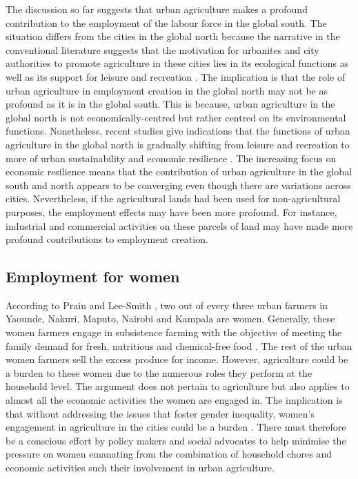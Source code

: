 The discussion so far suggests that urban agriculture makes a profound contribution to the employment of the labour force in the global south. The situation differs from the cities in the global north because the narrative in the conventional literature suggests that the motivation for urbanites and city authorities to promote agriculture in these cities lies in its ecological functions as well as its support for leisure and recreation \cite{Pearson2010}. The implication is that the role of urban agriculture in employment creation in the global north may not be as profound as it is in the global south. This is because, urban agriculture in the global north is not economically-centred but rather centred on its environmental functions. Nonetheless, recent studies give indications that the functions of urban agriculture in the global north is gradually shifting from leisure and recreation to more of urban sustainability and economic resilience \cite{McClintock2010}. The increasing focus on economic resilience means that the contribution of urban agriculture in the global south and north appears to be converging even though there are variations across cities. Nevertheless, if the agricultural lands had been used for non-agricultural purposes, the employment effects may have been more profound. For instance, industrial and commercial activities on these parcels of land may have made more profound contributions to employment creation.

\subsection{Employment for women}

According to Prain and Lee-Smith \cite{Prain2010}, two out of every three urban farmers in Yaounde, Nakuri, Maputo, Nairobi and Kampala are women. Generally, these women farmers engage in subsistence farming with the objective of meeting the family demand for fresh, nutritious and chemical-free food \cite{Gamhewage2015}. The rest of the urban women farmers sell the excess produce for income. However, agriculture could be a burden to these women due to the numerous roles they perform at the household level. The argument does not pertain to agriculture but also applies to almost all the economic activities the women are engaged in. The implication is that without addressing the issues that foster gender inequality, women's engagement in agriculture in the cities could be a burden \cite{Veenhuizen}. There must therefore be a conscious effort by policy makers and social advocates to help minimise the pressure on women emanating from the combination of household chores and economic activities such their involvement in urban agriculture.

